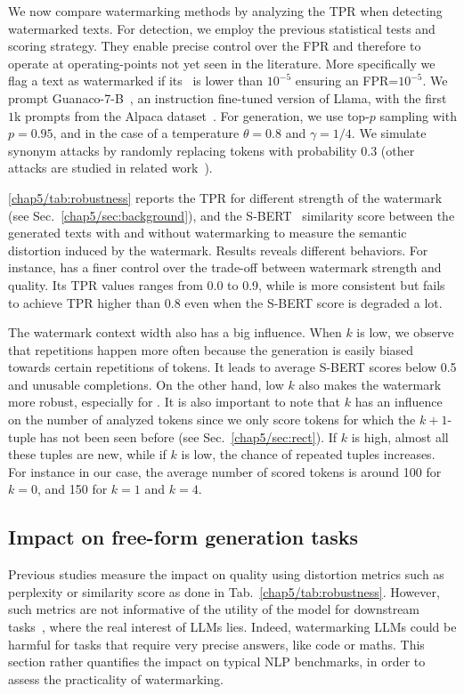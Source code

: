 




We now compare watermarking methods by analyzing the TPR when detecting watermarked texts.
For detection, we employ the previous statistical tests and scoring strategy.
They enable precise control over the FPR and therefore to operate at operating-points not yet seen in the literature.
More specifically we flag a text as watermarked if its \pval\ is lower than $10^{-5}$ ensuring an FPR=$10^{-5}$.
We prompt Guanaco-7-B~\citep{dettmers2023qlora}, an instruction fine-tuned version of Llama, with the first $1$k prompts from the Alpaca dataset~\citep{alpaca}.
For generation, we use top-$p$ sampling with $p=0.95$, and in the case of \citep{kirchenbauer2023watermark} a temperature $\theta =0.8$ and $\gamma=1/4$.
We simulate synonym attacks by randomly replacing tokens with probability $0.3$ (other attacks are studied in related work~\citep{kirchenbauer2023reliability}).

\autoref{chap5/tab:robustness} reports the TPR for different strength of the watermark (see Sec.~\ref{chap5/sec:background}), and the S-BERT~\citep{reimers2019sentence} similarity score between the generated texts with and without watermarking to measure the semantic distortion induced by the watermark. 
Results reveals different behaviors.
For instance, \citep{kirchenbauer2023watermark} has a finer control over the trade-off between watermark strength and quality.
Its TPR values ranges from 0.0 to 0.9, while \citep{aaronson2023watermarking} is more consistent but fails to achieve TPR higher than 0.8 even when the S-BERT score is degraded a lot.

The watermark context width also has a big influence. 
When $k$ is low, we observe that repetitions happen more often because the generation is easily biased towards certain repetitions of tokens.
It leads to average S-BERT scores below 0.5 and unusable completions.
On the other hand, low $k$ also makes the watermark more robust, especially for \citep{kirchenbauer2023watermark}.
It is also important to note that $k$ has an influence on the number of analyzed tokens since we only score tokens for which the $k+1$-tuple has not been seen before (see Sec.~\ref{chap5/sec:rect}).
If $k$ is high, almost all these tuples are new, while if $k$ is low, the chance of repeated tuples increases.
For instance in our case, the average number of scored tokens is around 100 for $k=0$, and 150 for $k=1$ and $k=4$.


\subsection{Impact on free-form generation tasks}
\label{chap5/sec:free-form}
Previous studies measure the impact on quality using distortion metrics such as perplexity or similarity score as done in Tab.~\ref{chap5/tab:robustness}.
However, such metrics are not informative of the utility of the model for downstream tasks~\citep{holtzman2019curious}, where the real interest of LLMs lies. 
Indeed, watermarking LLMs could be harmful for tasks that require very precise answers, like code or maths.
This section rather quantifies the impact on typical NLP benchmarks, in order to assess the practicality of watermarking.

